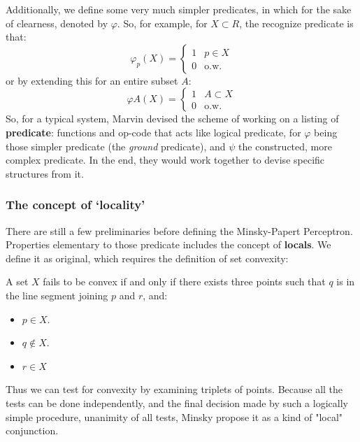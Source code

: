 Additionally, we define some very much simpler predicates, in which for the sake of clearness, denoted by $\varphi$. So, for example, for $X\subset R$, the recognize predicate is that: 
\begin{equation*}
    \varphi_{p}(X) = \begin{cases}
        1 & p \in X\\
        0 & \text{o.w.}
    \end{cases}
\end{equation*}
or by extending this for an entire subset $A$: \begin{equation*}
    \varphi{A}(X) = \begin{cases}
        1 & A \subset X\\
        0 & \text{o.w.}
    \end{cases}
\end{equation*}
So, for a typical system, Marvin devised the scheme of working on a listing of \textbf{predicate}: functions and op-code that acts like logical predicate, for $\varphi$ being those simpler predicate (the \textit{ground} predicate), and $\psi$ the constructed, more complex predicate. In the end, they would work together to devise specific structures from it. 

\subsubsection{The concept of `locality'}

There are still a few preliminaries before defining the Minsky-Papert Perceptron. Properties elementary to those predicate includes the concept of \textbf{locals}. We define it as original, which requires the definition of set convexity: 
\begin{definition}
    A set $X$ fails to be convex if and only if there exists three points such that $q$ is in the line segment joining $p$ and $r$, and: 
    \begin{itemize}[noitemsep,topsep=0pt]
        \item $p\in X$. 
        \item $q\not\in X$. 
        \item $r\in X$
    \end{itemize}
\end{definition}
Thus we can test for convexity by examining triplets of points. Because all the tests can be done independently, and the final decision made by such a logically simple procedure, unanimity of all tests, Minsky propose it as a kind of "local" conjunction. 

